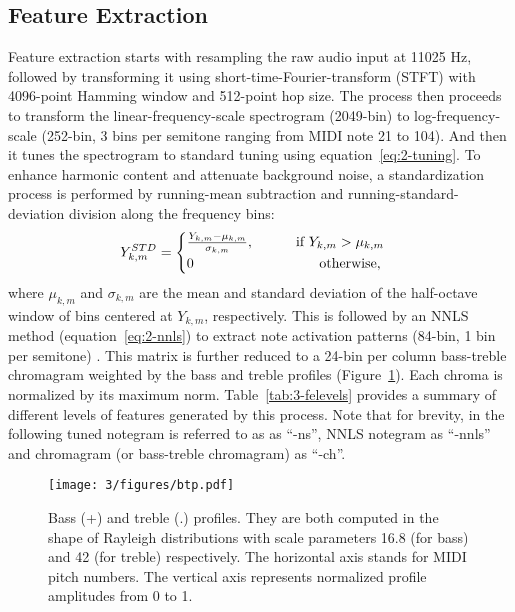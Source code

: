 \subsection{Feature Extraction} \label{sec:3-chordino-like fe}
Feature extraction starts with resampling the raw audio input at 11025 Hz, followed by transforming it using short-time-Fourier-transform (STFT) with 4096-point Hamming window and 512-point hop size. The process then proceeds to transform the linear-frequency-scale spectrogram (2049-bin) to log-frequency-scale (252-bin, 3 bins per semitone ranging from MIDI note 21 to 104). And then it tunes the spectrogram to standard tuning using equation~\ref{eq:2-tuning}. To enhance harmonic content and attenuate background noise, a standardization process is performed by running-mean subtraction and running-standard-deviation division along the frequency bins: %
\begin{equation}
	Y^{STD}_{k,m} = 
	\begin{cases}
		{{Y_{k,m} - \mu_{k,m}} \over \sigma_{k,m}}, \text{\quad\quad\quad if } Y_{k,m} > \mu_{k,m}\\
		0 \quad\quad\quad\quad\quad\quad\quad\quad\quad\text{otherwise,}
	\end{cases}
\end{equation}
where $\mu_{k,m}$ and $\sigma_{k,m}$ are the mean and standard deviation of the half-octave window of bins centered at $Y_{k,m}$, respectively. This is followed by an NNLS method  (equation~\ref{eq:2-nnls}) to extract note activation patterns (84-bin, 1 bin per semitone) \cite{mauch2010approximate}. This matrix is further reduced to a 24-bin per column bass-treble chromagram weighted by the bass and treble profiles (Figure~\ref{fig:3-btprofile}). Each chroma is normalized by its maximum norm. Table~\ref{tab:3-felevels} provides a summary of different levels of features generated by this process. Note that for brevity, in the following tuned notegram is referred to as as ``-ns'', NNLS notegram as ``-nnls'' and chromagram (or bass-treble chromagram) as ``-ch''.

\begin{figure}[htb]
\centering
\texttt{[image: 3/figures/btp.pdf]}
\caption{Bass (+) and treble (.) profiles. They are both computed in the shape of Rayleigh distributions with scale parameters 16.8 (for bass) and 42 (for treble) respectively. The horizontal axis stands for MIDI pitch numbers. The vertical axis represents normalized profile amplitudes from 0 to 1.}
\label{fig:3-btprofile}
\end{figure}

